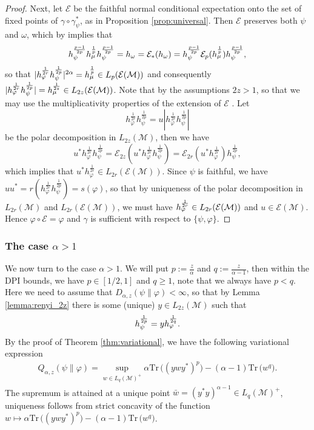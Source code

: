 \documentclass[12pt]{article}
\theoremstyle{definition}
\theoremstyle{remark}
\numberwithin{equation}{section}
\def\cE{\mathcal E}
\def\Me{\mathcal M}
\def \Tr{\mathrm{Tr}\,}
\def\ffi{\varphi}
\begin{document}
\begin{proof}
Next, let $\mathcal E$ be the faithful  normal conditional expectation onto the
set of fixed points of $\gamma\circ\gamma^*_\psi$, as in Proposition \ref{prop:universal}. Then
$\mathcal E$ preserves both $\psi$ and $\omega$, which by
\cite{junge2003noncommutative}   implies that 
\[
h_\psi^{p-1\over 2p}h_\mu^{\frac1p}h_\psi^{p-1\over 2p}=h_\omega=\mathcal
E_*(h_\omega)=h_\psi^{p-1\over 2p}\cE_p(h_\mu^{\frac1p})h_\psi^{p-1\over 2p},
\]
so that $|h_\ffi^{1\over 2r}h_\psi^{1\over 2p}|^{2\alpha}= h_\mu^{\frac1p}\in
L_p(\cE(\Me))$ and consequently $|h_\varphi^{\frac1{2r}}h_\psi^{\frac1{2p}}|=h_\mu^{1\over
2z}\in L_{2z}(\mathcal E(\Me))$.
Note that by the assumptions $2z>1$, so that we may use the multiplicativity properties
of the extension of $\mathcal E$ \cite{junge2003noncommutative}. Let 
\[
h_\varphi^{\frac1{2r}}h_\psi^{\frac1{2p}}=u|h_\varphi^{\frac1{2r}}h_\psi^{\frac1{2p}}|
\]
be the polar decomposition in $L_{2z}(\Me)$, then we have 
\[
u^*h_\varphi^{\frac1{2r}}h_\psi^{\frac1{2p}}=\mathcal
E_{2z}(u^*h_\varphi^{\frac1{2r}}h_\psi^{\frac1{2p}})=\mathcal
E_{2r}(u^*h_\varphi^{\frac1{2r}})h_\psi^{\frac1{2p}},
\]
which implies that $u^*h_\varphi^{\frac1{2r}}\in L_{2r}(\cE(\Me))$. Since $\psi$ is
faithful, we have $uu^*=r(h_\varphi^{\frac1{2r}}h_\psi^{\frac1{2p}})=s(\ffi)$, so that by uniqueness of the polar decomposition in
$L_{2r}(\Me)$ and $L_{2r}(\cE(\Me))$, we
must have $h_\ffi^{1\over 2r}\in L_{2r}(\cE(\Me))$ and $u\in \cE(\Me)$.
Hence $\ffi\circ\mathcal E=\ffi$ and $\gamma$ is sufficient with respect to
$\{\psi,\varphi\}$. 

\end{proof}


\subsubsection{The case $\alpha>1$}

We now turn to the case $\alpha>1$. We will put $p:=\frac z\alpha$ and
$q:=\frac z{\alpha-1}$, then within the DPI bounds, we have $p\in [1/2,1]$ and $q\ge 1$,
note that we always have $p<q$. Here we need to assume that
$D_{\alpha,z}(\psi\|\ffi)<\infty$, so that by Lemma \ref{lemma:renyi_2z} there is some
(unique)  $y\in L_{2z}(\Me)$ such that
\[
h_{\psi}^{1\over 2p}=y h_\ffi^{1\over 2q}.
\]
By the proof of Theorem \ref{thm:variational}, we have the following variational
expression
\begin{align}\label{eq:variationalq}
Q_{\alpha,z}(\psi\|\varphi) =\sup_{w\in
L_q(\Me)^+}\alpha\Tr\bigl((ywy^*)^p\bigr)-(\alpha-1)\Tr \bigl(w^q\bigr).
\end{align}
 The supremum is attained at a unique point $\bar
w=(y^*y)^{\alpha-1}\in L_q(\Me)^+$, uniqueness follows from strict concavity of the
function $w\mapsto \alpha\Tr\bigl((ywy^*)^p\bigr)-(\alpha-1)\Tr\bigl( w^q\bigr)$.
\end{document}
